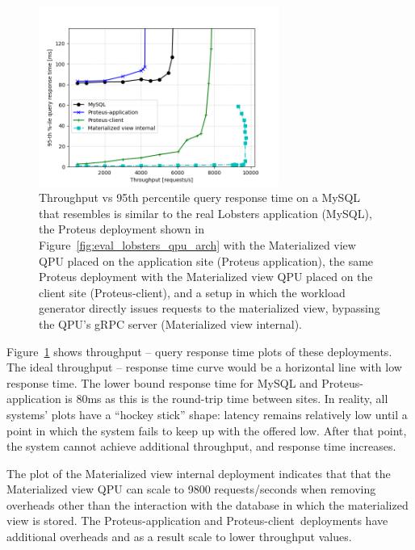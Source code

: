 \begin{figure}[H]
\centering
  \includegraphics[width=0.7\textwidth]{./figures/evaluation/responseTime.png}
  \caption{Throughput vs 95th percentile query response time on a MySQL that resembles is similar to the real Lobsters application (MySQL), the Proteus deployment shown in Figure~\ref{fig:eval_lobsters_qpu_arch}
  with the Materialized view QPU placed on the application site (Proteus application), the same Proteus deployment with the Materialized view QPU placed on the client site (Proteus-client),
  and a setup in which the workload generator directly issues requests to the materialized view, bypassing the QPU's gRPC server (Materialized view internal).}
  \label{fig:responseTime}
\end{figure}

Figure~\ref{fig:responseTime} shows throughput -- query response time plots of these deployments.
The ideal throughput -- response time curve would be a horizontal line with low response time.
The lower bound response time for MySQL and Proteus-application is 80ms as this is the round-trip time between sites.
In reality, all systems' plots have a ``hockey stick'' shape:
latency remains relatively low until a point in which the system fails to keep up with the offered low.
After that point, the system cannot achieve additional throughput, and response time increases.

The plot of the Materialized view internal deployment indicates that that the Materialized view QPU can scale to 9800
requests/seconds when removing overheads other than the interaction with the database in which the materialized view is stored.
The Proteus-application and Proteus-client deployments have additional overheads and as a result scale to lower
throughput values.

